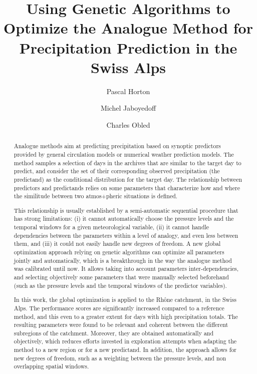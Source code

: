 \documentclass[review]{elsarticle}
\begin{document}
\begin{frontmatter}

\title{Using Genetic Algorithms to Optimize the Analogue Method for Precipitation Prediction in the Swiss Alps}

\author[unil,unibe,terranum]{Pascal Horton}

\author[unil]{Michel Jaboyedoff}
\author[lthe]{Charles Obled}

\address[unil]{University of Lausanne, Institute of Earth Sciences, Lausanne, Switzerland}
\address[unibe]{University of Bern, Oeschger Centre for Climate Change Research, Institute of Geography, Bern, Switzerland}
\address[terranum]{Terranum SARL, Bussigny, Switzerland}
\address[lthe]{Universit\'{e} de Grenoble-Alpes, LTHE, Grenoble, France}

\begin{abstract}
Analogue methods aim at predicting precipitation based on synoptic predictors provided by general circulation models or numerical weather prediction models. The method samples a selection of days in the archives that are similar to the target day to predict, and consider the set of their corresponding observed precipitation (the predictand) as the conditional distribution for the target day. The relationship between predictors and predictands relies on some parameters that characterize how and where the similitude between two atmos+pheric situations is defined.

This relationship is usually established by a semi-automatic sequential procedure that has strong limitations: (i) it cannot automatically choose the pressure levels and the temporal windows for a given meteorological variable, (ii) it cannot handle dependencies between the parameters within a level of analogy, and even less between them, and (iii) it could not easily handle new degrees of freedom. A new global optimization approach relying on genetic algorithms can optimize all parameters jointly and automatically, which is a breakthrough in the way the analogue method was calibrated until now. It allows taking into account parameters inter-dependencies, and selecting objectively some parameters that were manually selected beforehand (such as the pressure levels and the temporal windows of the predictor variables).

In this work, the global optimization is applied to the Rh\^{o}ne catchment, in the Swiss Alps. The performance scores are significantly increased compared to a reference method, and this even to a greater extent for days with high precipitation totals. The resulting parameters were found to be relevant and coherent between the different subregions of the catchment. Moreover, they are obtained automatically and objectively, which reduces efforts invested in exploration attempts when adapting the method to a new region or for a new predictand. In addition, the approach allows for new degrees of freedom, such as a weighting between the pressure levels, and non overlapping spatial windows.
\end{abstract}


\end{frontmatter}
\end{document}
